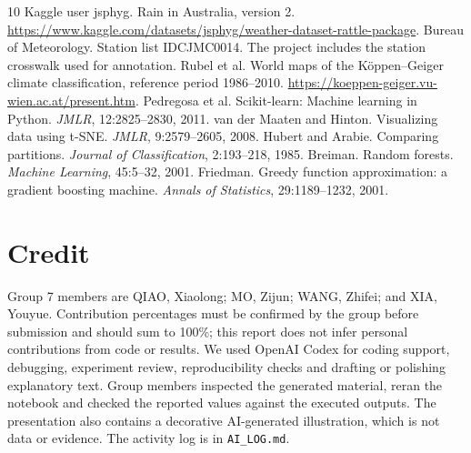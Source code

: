 \documentclass{article}
\begin{document}
\clearpage
\begin{thebibliography}{10}\small
{} Kaggle user jsphyg. Rain in Australia, version 2. \url{https://www.kaggle.com/datasets/jsphyg/weather-dataset-rattle-package}.
 Bureau of Meteorology. Station list IDCJMC0014. The project includes the station crosswalk used for annotation.
 Rubel et al. World maps of the Köppen--Geiger climate classification, reference period 1986--2010. \url{https://koeppen-geiger.vu-wien.ac.at/present.htm}.
 Pedregosa et al. Scikit-learn: Machine learning in Python. \emph{JMLR}, 12:2825--2830, 2011.
 van der Maaten and Hinton. Visualizing data using t-SNE. \emph{JMLR}, 9:2579--2605, 2008.
 Hubert and Arabie. Comparing partitions. \emph{Journal of Classification}, 2:193--218, 1985.
 Breiman. Random forests. \emph{Machine Learning}, 45:5--32, 2001.
 Friedman. Greedy function approximation: a gradient boosting machine. \emph{Annals of Statistics}, 29:1189--1232, 2001.
\end{thebibliography}

\section*{Credit}
Group 7 members are QIAO, Xiaolong; MO, Zijun; WANG, Zhifei; and XIA, Youyue. Contribution percentages must be confirmed by the group before submission and should sum to 100\%; this report does not infer personal contributions from code or results. We used OpenAI Codex for coding support, debugging, experiment review, reproducibility checks and drafting or polishing explanatory text. Group members inspected the generated material, reran the notebook and checked the reported values against the executed outputs. The presentation also contains a decorative AI-generated illustration, which is not data or evidence. The activity log is in \texttt{AI\_LOG.md}.
\end{document}

